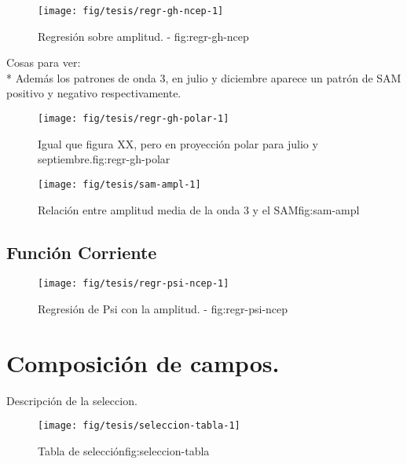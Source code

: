 \documentclass[spanish,a4paper]{book}
\begin{document}
\begin{figure}

{\centering \texttt{[image: fig/tesis/regr-gh-ncep-1]} 

}

\caption{Regresión sobre amplitud. - fig:regr-gh-ncep}\label{fig:regr-gh-ncep}
\end{figure}

Cosas para ver:\\
* Además los patrones de onda 3, en julio y diciembre aparece un patrón
de SAM positivo y negativo respectivamente.

\begin{figure}
\texttt{[image: fig/tesis/regr-gh-polar-1]} \caption{Igual que figura  XX, pero en proyección polar para julio y septiembre.{fig:regr-gh-polar}}\label{fig:regr-gh-polar}
\end{figure}

\begin{figure}
\texttt{[image: fig/tesis/sam-ampl-1]} \caption{Relación entre amplitud media de la onda 3 y el SAM{fig:sam-ampl}}\label{fig:sam-ampl}
\end{figure}

\subsection{Función Corriente}\label{funcion-corriente-1}

\begin{figure}

{\centering \texttt{[image: fig/tesis/regr-psi-ncep-1]} 

}

\caption{Regresión de Psi con la amplitud. - fig:regr-psi-ncep}\label{fig:regr-psi-ncep}
\end{figure}

\section{Composición de campos.}\label{composicion-de-campos.}

Descripción de la seleccion.

\begin{figure}

{\centering \texttt{[image: fig/tesis/seleccion-tabla-1]} 

}

\caption{Tabla de selección{fig:seleccion-tabla}}\label{fig:seleccion-tabla}
\end{figure}
\end{document}
